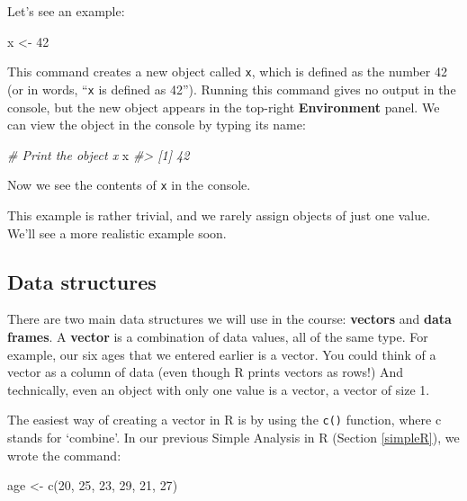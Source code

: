 \documentclass[
]{memoir}
\newenvironment{Shaded}{\begin{snugshade}}{\end{snugshade}}
\newcommand{\CommentTok}[1]{\textcolor[rgb]{0.56,0.35,0.01}{\textit{#1}}}
\newcommand{\DecValTok}[1]{\textcolor[rgb]{0.00,0.00,0.81}{#1}}
\newcommand{\FunctionTok}[1]{\textcolor[rgb]{0.00,0.00,0.00}{#1}}
\newcommand{\NormalTok}[1]{#1}
\newcommand{\OtherTok}[1]{\textcolor[rgb]{0.56,0.35,0.01}{#1}}
\begin{document}
Let's see an example:

\begin{Shaded}
\begin{Highlighting}[]
\NormalTok{x }\OtherTok{\textless{}{-}} \DecValTok{42}
\end{Highlighting}
\end{Shaded}

This command creates a new object called \texttt{x}, which is defined as the number 42 (or in words, ``\texttt{x} is defined as 42''). Running this command gives no output in the console, but the new object appears in the top-right \textbf{Environment} panel. We can view the object in the console by typing its name:

\begin{Shaded}
\begin{Highlighting}[]
\CommentTok{\# Print the object x}
\NormalTok{x}
\CommentTok{\#\textgreater{} [1] 42}
\end{Highlighting}
\end{Shaded}

Now we see the contents of \texttt{x} in the console.

This example is rather trivial, and we rarely assign objects of just one value. We'll see a more realistic example soon.

\hypertarget{data-structures}{%
\subsection{Data structures}\label{data-structures}}

There are two main data structures we will use in the course: \textbf{vectors} and \textbf{data frames}. A \textbf{vector} is a combination of data values, all of the same type. For example, our six ages that we entered earlier is a vector. You could think of a vector as a column of data (even though R prints vectors as rows!) And technically, even an object with only one value is a vector, a vector of size 1.

The easiest way of creating a vector in R is by using the \texttt{c()} function, where c stands for `combine'. In our previous Simple Analysis in R (Section \ref{simpleR}), we wrote the command:

\begin{Shaded}
\begin{Highlighting}[]
\NormalTok{age }\OtherTok{\textless{}{-}} \FunctionTok{c}\NormalTok{(}\DecValTok{20}\NormalTok{, }\DecValTok{25}\NormalTok{, }\DecValTok{23}\NormalTok{, }\DecValTok{29}\NormalTok{, }\DecValTok{21}\NormalTok{, }\DecValTok{27}\NormalTok{)}
\end{Highlighting}
\end{Shaded}
\end{document}
